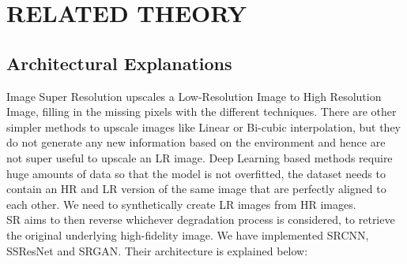 \newpage
\section{RELATED THEORY}
\subsection{Architectural Explanations}
Image Super Resolution upscales a Low-Resolution Image to High Resolution Image, filling in the missing pixels with the different techniques. There are other simpler methods to upscale images like Linear or Bi-cubic interpolation, but they do not generate any new information based on the environment and hence are not super useful to upscale an LR image. Deep Learning based methods require huge amounts of data so that the model is not overfitted, the dataset needs to contain an HR and LR version of the same image that are perfectly aligned to each other. We need to synthetically create LR images from HR images.\\
SR aims to then reverse whichever degradation process is considered, to retrieve the original underlying high-fidelity image. We have implemented SRCNN, SSResNet and SRGAN. Their architecture is explained below: 
